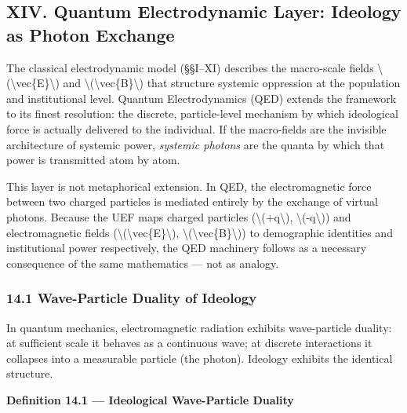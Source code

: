 {\protect{}\label{sec-qed}
\subsection{XIV. Quantum Electrodynamic Layer: Ideology as Photon
Exchange}\label{xiv.-quantum-electrodynamic-layer-ideology-as-photon-exchange}

The classical electrodynamic model (§§I--XI) describes the macro-scale
fields \textbackslash(\textbackslash vec\{E\}\textbackslash) and
\textbackslash(\textbackslash vec\{B\}\textbackslash) that structure
systemic oppression at the population and institutional level. Quantum
Electrodynamics (QED) extends the framework to its finest resolution:
the discrete, particle-level mechanism by which ideological force is
actually delivered to the individual. If the macro-fields are the
invisible architecture of systemic power, \emph{systemic photons} are
the quanta by which that power is transmitted atom by atom.

This layer is not metaphorical extension. In QED, the electromagnetic
force between two charged particles is mediated entirely by the exchange
of virtual photons. Because the UEF maps charged particles
(\textbackslash(+q\textbackslash), \textbackslash(-q\textbackslash)) and
electromagnetic fields
(\textbackslash(\textbackslash vec\{E\}\textbackslash),
\textbackslash(\textbackslash vec\{B\}\textbackslash)) to demographic
identities and institutional power respectively, the QED machinery
follows as a necessary consequence of the same mathematics --- not as
analogy.

\subsubsection{14.1 Wave-Particle Duality of
Ideology}\label{wave-particle-duality-of-ideology}

In quantum mechanics, electromagnetic radiation exhibits wave-particle
duality: at sufficient scale it behaves as a continuous wave; at
discrete interactions it collapses into a measurable particle (the
photon). Ideology exhibits the identical structure.

\textbf{Definition 14.1 --- Ideological Wave-Particle Duality}

}
